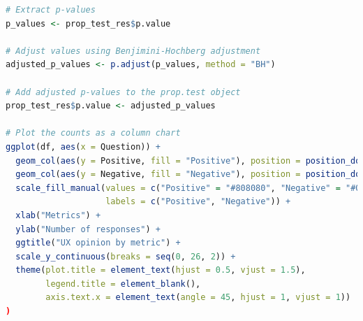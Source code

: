 \documentclass[article]{IEEEtran}
\begin{document}
\begin{lstlisting}[style=rListingStyle, language=R, caption={R-code used to create column graphs}, captionpos=t]
# Extract p-values
p_values <- prop_test_res$p.value

# Adjust values using Benjimini-Hochberg adjustment
adjusted_p_values <- p.adjust(p_values, method = "BH")

# Add adjusted p-values to the prop.test object
prop_test_res$p.value <- adjusted_p_values

# Plot the counts as a column chart
ggplot(df, aes(x = Question)) + 
  geom_col(aes(y = Positive, fill = "Positive"), position = position_dodge(width = 0.4), width = 0.6) + 
  geom_col(aes(y = Negative, fill = "Negative"), position = position_dodge(width = 0.4), width = 0.6) + 
  scale_fill_manual(values = c("Positive" = "#808080", "Negative" = "#000000"),
                    labels = c("Positive", "Negative")) +
  xlab("Metrics") +
  ylab("Number of responses") +
  ggtitle("UX opinion by metric") +
  scale_y_continuous(breaks = seq(0, 26, 2)) +
  theme(plot.title = element_text(hjust = 0.5, vjust = 1.5),
        legend.title = element_blank(),
        axis.text.x = element_text(angle = 45, hjust = 1, vjust = 1)) 
) \end{lstlisting}
\end{document}
